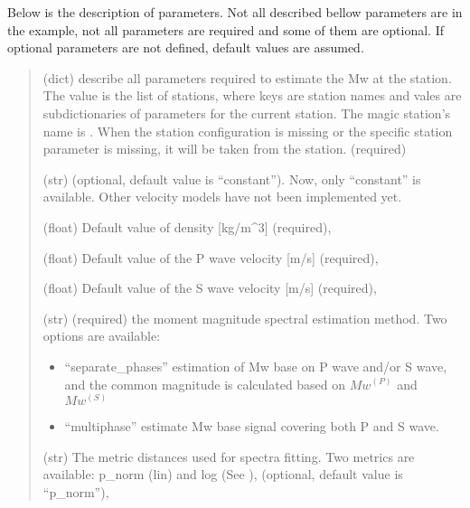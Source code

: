 \documentclass[letterpaper,10pt,english]{sphinxmanual}
\begin{document}
\sphinxAtStartPar
Below is the description of parameters. Not all described bellow parameters are in the example,
not all parameters are required and some of them are optional.
If optional parameters are not defined, default values are assumed.
\begin{quote}\begin{description}
\sphinxAtStartPar
(dict) describe all parameters required to estimate the Mw
at the station. The value is the list of stations, where keys are station names
and vales are sub\sphinxhyphen{}dictionaries of parameters for the current station.
The magic station’s name is . When the station configuration is missing or
the specific station parameter is missing, it will be taken from the  station.
(required)

\sphinxAtStartPar
(str) (optional, default value is “constant”). Now, only “constant” is available.
Other velocity models have not been implemented yet.

\sphinxAtStartPar
(float) Default value of density {[}kg/m\textasciicircum{}3{]} (required),

\sphinxAtStartPar
(float)  Default value of the P wave velocity {[}m/s{]} (required),

\sphinxAtStartPar
(float) Default value of the S wave velocity {[}m/s{]} (required),

\sphinxAtStartPar
(str) (required) the moment magnitude spectral estimation method.
Two options are available:
\begin{itemize}
\item {} 
\sphinxAtStartPar
“separate\_phases” \sphinxhyphen{} estimation of Mw base on P wave and/or S wave, and the common magnitude is
calculated based on \(Mw^{(P)}\) and \(Mw^{(S)}\)

\item {} 
\sphinxAtStartPar
“multiphase” \sphinxhyphen{} estimate Mw base signal covering both P and S wave.

\end{itemize}

\sphinxAtStartPar
(str) The metric distances used for spectra fitting.
Two metrics are available: p\_norm (lin) and log (See {\hyperref[\detokenize{description:inversion-method}]{}}),
(optional, default value is “p\_norm”),


\end{description}
\end{quote}
\end{document}
